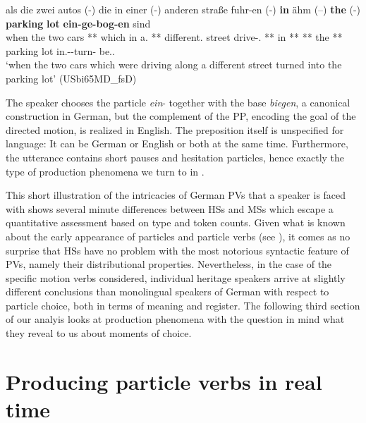 \documentclass[output=paper,colorlinks,citecolor=brown]{langscibook}
\begin{document}
\ea
\label{ex:kelleretal:reinfahren_homophdiamorph}
\gll als die zwei autos (-) die in einer (-) anderen straße fuhr-en (-) \textbf{in} ähm (--) \textbf{the} (-) \textbf{parking} \textbf{lot} \textbf{ein-ge-bog-en} sind \\
when the two cars {**} which in a.\Dat{} {**} different.\Dat{} street drive-\Pst.\Tpl{} {**} in {**} {**} the {**} parking lot in.\Vpart{}-\Ptcp{}-turn-\Ptcp{} be.\Prs.\Tpl{} \\
\glt `when the two cars which were driving along a different street turned into the parking lot' (USbi65MD\_fsD)
\z

The speaker chooses the particle \textit{ein}- together with the base \textit{biegen}, a canonical construction in German, but the complement of the PP, encoding the goal of the directed motion, is realized in English. The preposition itself is unspecified for language: It can be German or English or both at the same time. Furthermore, the utterance contains short pauses and hesitation particles, hence exactly the type of production phenomena we turn to in . 

This short illustration of the intricacies of German PVs that a speaker is faced with shows several minute differences between HSs and MSs which escape a quantitative assessment based on type and token counts. Given what is known about the early appearance of particles and particle verbs (see \cite{chapters/05}), it comes as no surprise that HSs have no problem with the most notorious syntactic feature of PVs, namely their distributional properties. Nevertheless, in the case of the specific motion verbs considered, individual heritage speakers arrive at slightly different conclusions than monolingual speakers of German with respect to particle choice, both in terms of meaning and register. The following third section of our analyis looks at production phenomena with the question in mind what they reveal to us about moments of choice. 


\section{Producing particle verbs in real time} \label{sec:kelleretal:lexproduction}
\end{document}
